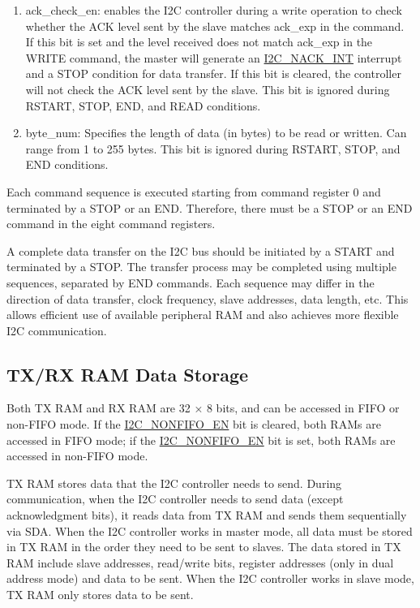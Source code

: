 \documentclass[main\_\_EN.tex]{subfiles}
\begin{document}
\begin{enumerate}
\item ack\_check\_en: enables the I2C controller during a write operation to check whether the ACK level sent by the slave matches ack\_exp in the command. If this bit is set and the level received does not match ack\_exp in the WRITE command, the master will generate an \hyperref[int:i2c-nack]{I2C\_NACK\_INT} interrupt and a STOP condition for data transfer. If this bit is cleared, the controller will not check the ACK level sent by the slave. This bit is ignored during RSTART, STOP, END, and READ conditions.

\item byte\_num: Specifies the length of data (in bytes) to be read or written. Can range from 1 to 255 bytes. This bit is ignored during RSTART, STOP, and END conditions.

\end{enumerate}

Each command sequence is executed starting from command register 0 and terminated by a STOP or an END. Therefore, there must be a STOP or an END command in the eight command registers.

A complete data transfer on the I2C bus should be initiated by a START and terminated by a STOP. The transfer process may be completed using multiple sequences, separated by END commands. Each sequence may differ in the direction of data transfer, clock frequency, slave addresses, data length, etc. This allows efficient use of available peripheral RAM and also achieves more flexible I2C communication.

\subsection{TX/RX RAM Data Storage}\label{subsubsec:i2c-txrx}
Both TX RAM and RX RAM are 32 × 8 bits, and can be accessed in FIFO or non-FIFO mode. If the \hyperref[fielddesc:I2CNONFIFOEN]{I2C\_NONFIFO\_EN} bit is cleared, both RAMs are accessed in FIFO mode; if the \hyperref[fielddesc:I2CNONFIFOEN]{I2C\_NONFIFO\_EN} bit is set, both RAMs are accessed in non-FIFO mode.

TX RAM stores data that the I2C controller needs to send. During communication, when the I2C controller needs to send data (except acknowledgment bits), it reads data from TX RAM and sends them sequentially via SDA. When the I2C controller works in master mode, all data must be stored in TX RAM in the order they need to be sent to slaves. The data stored in TX RAM include slave addresses, read/write bits, register addresses (only in dual address mode) and data to be sent. When the I2C controller works in slave mode, TX RAM only stores data to be sent.
\end{document}
